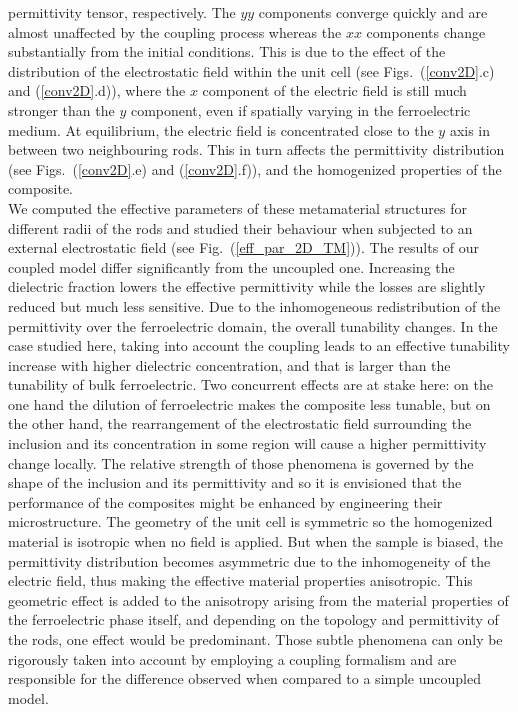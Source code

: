 \documentclass[openacc]{rsproca_new}%
\newcommand{\fig}[1]{Fig.~(\ref{#1})}
\begin{document}
permittivity tensor, respectively. The $yy$ components converge quickly
and are almost unaffected by the coupling process whereas the
$xx$ components change substantially from the initial conditions.
This is due to the effect of the distribution
of the electrostatic field within the unit cell (see Figs.~(\ref{conv2D}.c) and (\ref{conv2D}.d)),
where the $x$ component of the electric field is still much stronger
than the $y$ component, even if spatially varying in the ferroelectric medium.
At equilibrium, the electric field is concentrated close to the $y$ axis in between two neighbouring
rods. This in turn affects the permittivity distribution (see Figs.~(\ref{conv2D}.e) and (\ref{conv2D}.f)),
and the homogenized properties of the composite.\\
We computed the effective parameters of these metamaterial structures for different
radii of the rods and studied their behaviour when subjected to an external
electrostatic field (see \fig{eff_par_2D_TM}). The results of our coupled
model differ significantly from the uncoupled one. Increasing the dielectric fraction
lowers the effective permittivity while the losses are slightly reduced but much less sensitive.
Due to the inhomogeneous redistribution of the permittivity over the ferroelectric domain, the
overall tunability changes. In the case studied here, taking into account
the coupling leads to an effective tunability increase with
higher dielectric concentration, and that is larger than the tunability
 of bulk ferroelectric. Two concurrent effects are at stake here: on the one hand
the dilution of ferroelectric makes the composite less tunable, but on the other hand,
the rearrangement of the electrostatic field surrounding the inclusion and its
concentration in some region will cause a higher permittivity change locally.
The relative strength of those phenomena is governed by the shape of the inclusion and its permittivity
and so it is envisioned that the performance of the composites might be enhanced by engineering
their microstructure.
The geometry of the unit cell is symmetric so the homogenized material is
isotropic when no field is applied.
But when the sample is biased, the permittivity distribution becomes asymmetric due
to the inhomogeneity of the electric field, thus making the effective material properties anisotropic.
This geometric effect is added to the anisotropy arising from the material properties of the ferroelectric
phase itself, and depending on the topology and permittivity of the rods, one effect would be predominant.
Those subtle phenomena can only be rigorously taken into account by employing a coupling formalism
and are responsible for the difference observed when compared to a simple uncoupled model.\\
\end{document}
